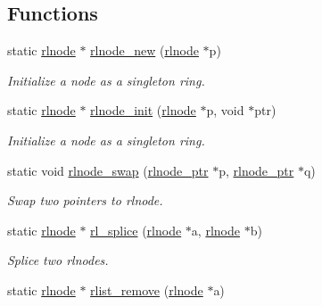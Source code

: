 \subsection*{Functions}
\begin{DoxyCompactItemize}
\item 
static \hyperlink{group__rlists_ga8f6244877f7ce2322c90525217ea6e7a}{rlnode} $\ast$ \hyperlink{group__rlists_gaccdb4bce65952fede472de20297eb36e}{rlnode\+\_\+new} (\hyperlink{group__rlists_ga8f6244877f7ce2322c90525217ea6e7a}{rlnode} $\ast$p)
\begin{DoxyCompactList}\small\item\em Initialize a node as a singleton ring. \end{DoxyCompactList}\item 
static \hyperlink{group__rlists_ga8f6244877f7ce2322c90525217ea6e7a}{rlnode} $\ast$ \hyperlink{group__rlists_ga578e6dc256d4f1580bd8500edf374aca}{rlnode\+\_\+init} (\hyperlink{group__rlists_ga8f6244877f7ce2322c90525217ea6e7a}{rlnode} $\ast$p, void $\ast$ptr)
\begin{DoxyCompactList}\small\item\em Initialize a node as a singleton ring. \end{DoxyCompactList}\item 
\mbox{\label{group__rlists_ga47c4de39ce6c032dd9fc23c88a883a4b}} 
static void \hyperlink{group__rlists_ga47c4de39ce6c032dd9fc23c88a883a4b}{rlnode\+\_\+swap} (\hyperlink{group__rlists_gaae2ea9be18d20f0c80a62a2f8e2eed4d}{rlnode\+\_\+ptr} $\ast$p, \hyperlink{group__rlists_gaae2ea9be18d20f0c80a62a2f8e2eed4d}{rlnode\+\_\+ptr} $\ast$q)
\begin{DoxyCompactList}\small\item\em Swap two pointers to rlnode. \end{DoxyCompactList}\item 
static \hyperlink{group__rlists_ga8f6244877f7ce2322c90525217ea6e7a}{rlnode} $\ast$ \hyperlink{group__rlists_gac04dfecc68239457f673c0a63c254541}{rl\+\_\+splice} (\hyperlink{group__rlists_ga8f6244877f7ce2322c90525217ea6e7a}{rlnode} $\ast$a, \hyperlink{group__rlists_ga8f6244877f7ce2322c90525217ea6e7a}{rlnode} $\ast$b)
\begin{DoxyCompactList}\small\item\em Splice two rlnodes. \end{DoxyCompactList}\item 
static \hyperlink{group__rlists_ga8f6244877f7ce2322c90525217ea6e7a}{rlnode} $\ast$ \hyperlink{group__rlists_ga9177b286dcefd1d853aae220a98d3c7b}{rlist\+\_\+remove} (\hyperlink{group__rlists_ga8f6244877f7ce2322c90525217ea6e7a}{rlnode} $\ast$a)

\end{DoxyCompactItemize}
